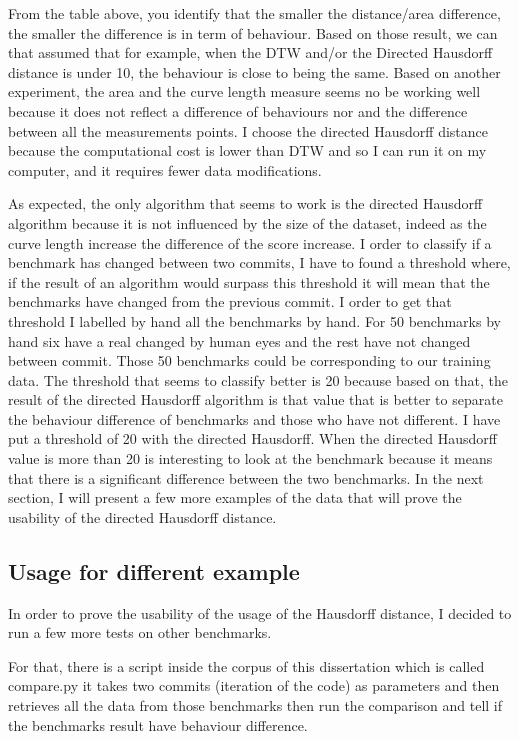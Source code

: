 \documentclass[12pt,a4paper]{article}
\begin{document}
From the table above, you identify that the smaller the distance/area difference, the smaller the difference is in term of behaviour. Based on those result, we can that assumed that for example, when the DTW and/or the Directed Hausdorff distance is under 10, the behaviour is close to being the same. Based on another experiment, the area and the curve length measure seems no be working well because it does not reflect a difference of behaviours nor and the difference between all the measurements points. I choose the directed Hausdorff distance because the computational cost is lower than DTW and so I can run it on my computer, and it requires fewer data modifications.


As expected, the only algorithm that seems to work is the directed Hausdorff algorithm because it is not influenced by the size of the dataset, indeed as the curve length increase the difference of the score increase. 
I order to classify if a benchmark has changed between two commits, I have to found a threshold where, if the result of an algorithm would surpass this threshold it will mean that the benchmarks have changed from the previous commit. I order to get that threshold I labelled by hand all the benchmarks by hand. For 50 benchmarks by hand six have a real changed by human eyes and the rest have not changed between commit. Those 50 benchmarks could be corresponding to our training data. The threshold that seems to classify better is 20 because based on that, the result of the directed Hausdorff algorithm is that value that is better to separate the behaviour difference of benchmarks and those who have not different.
I have put a threshold of 20 with the directed Hausdorff. When the directed Hausdorff value is more than 20 is interesting to look at the benchmark because it means that there is a significant difference between the two benchmarks. In the next section, I will present a few more examples of the data that will prove the usability of the directed Hausdorff distance. 


\subsection{Usage for different example}


In order to prove the usability of the usage of the Hausdorff distance, I decided to run a few more tests on other benchmarks.

For that, there is a script inside the corpus of this dissertation which is called compare.py it takes two commits (iteration of the code) as parameters and then retrieves all the data from those benchmarks then run the comparison and tell if the benchmarks result have behaviour difference. \\
\end{document}
